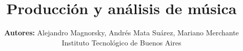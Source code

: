 \documentclass[journal, monochrome]{IEEEtran}
\begin{document}
%
\title{Producción y análisis de música}
%
%
%

\author{\textbf{Autores:} Alejandro Magnorsky, Andrés Mata Suárez, Mariano Merchante \\[5px]
        Instituto Tecnológico de Buenos Aires}
        
% 
%



% 




\end{document}

